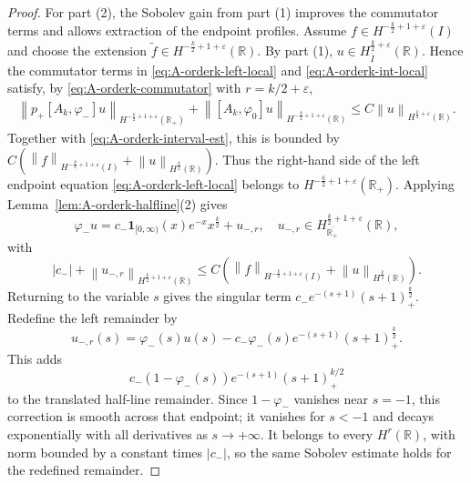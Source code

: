 \documentclass[11pt,reqno]{amsart}
\theoremstyle{plain}
\theoremstyle{definition}
\numberwithin{equation}{section}
\newcommand{\paren}[1]{\left(#1\right)}
\newcommand{\wt}[1]{\widetilde{#1}}
\newcommand{\norm}[1]{\left\lVert #1 \right\rVert}
\newcommand{\vph}{\varphi}
\newcommand{\R}{\mathbb{R}}
\begin{document}
\begin{proof}
For part (2), the Sobolev gain from part (1) improves the commutator
terms and allows extraction of the endpoint profiles.
Assume $f\in H^{-\frac{k}{2}+1+\varepsilon}(I)$ and choose the
extension $\wt f\in H^{-\frac{k}{2}+1+\varepsilon}(\R)$. By part (1),
$u\in H^{\frac{k}{2}+\varepsilon}_{\overline I}(\R)$. Hence the commutator
terms in \eqref{eq:A-orderk-left-local} and \eqref{eq:A-orderk-int-local}
satisfy, by \eqref{eq:A-orderk-commutator} with $r=k/2+\varepsilon$,
\begin{equation}
\begin{aligned}
    \norm{p_+[A_k,\vph_-]u}_{H^{-\frac{k}{2}+1+\varepsilon}(\R_+)}
    +\norm{[A_k,\vph_0]u}_{H^{-\frac{k}{2}+1+\varepsilon}(\R)}
    \le C\norm{u}_{H^{\frac{k}{2}+\varepsilon}(\R)} .
\end{aligned}
\end{equation}
Together with \eqref{eq:A-orderk-interval-est}, this is bounded by
$C\paren{\norm{f}_{H^{-\frac{k}{2}+1+\varepsilon}(I)}
+\norm{u}_{H^{\frac{k}{2}}(\R)}}$.
Thus the right-hand side of the left endpoint equation
\eqref{eq:A-orderk-left-local} belongs to
$H^{-\frac{k}{2}+1+\varepsilon}(\R_+)$. Applying
Lemma~\ref{lem:A-orderk-halfline}(2) gives
\begin{equation}
    \vph_-u
    =c_-\mathbf1_{[0,\infty)}(x)e^{-x}x^{\frac{k}{2}}+u_{-,r},
    \quad u_{-,r}\in H^{\frac{k}{2}+1+\varepsilon}_{\overline{\R_+}}(\R),
\end{equation}
with
\begin{equation}
    |c_-|+\norm{u_{-,r}}_{H^{\frac{k}{2}+1+\varepsilon}(\R)}
    \le C\paren{
    \norm{f}_{H^{-\frac{k}{2}+1+\varepsilon}(I)}
    +\norm{u}_{H^{\frac{k}{2}}(\R)} } .
\end{equation}
Returning to the variable $s$ gives the singular term
$c_-e^{-(s+1)}(s+1)_+^{\frac{k}{2}}$. Redefine the left remainder by
\begin{equation*}
    u_{-,r}(s)=\vph_-(s)u(s)
    -c_-\vph_-(s)e^{-(s+1)}(s+1)_+^{\frac{k}{2}}.
\end{equation*}
This adds
\begin{equation*}
    c_-(1-\vph_-(s))e^{-(s+1)}(s+1)_+^{k/2}
\end{equation*}
to the translated half-line remainder. Since $1-\vph_-$ vanishes near
$s=-1$, this correction is smooth across that endpoint; it vanishes for
$s<-1$ and decays exponentially with all derivatives as $s\to+\infty$.
It belongs to every $H^r(\R)$, with norm bounded by a constant times
$|c_-|$, so the same Sobolev estimate holds for the redefined remainder.

\end{proof}
\end{document}
